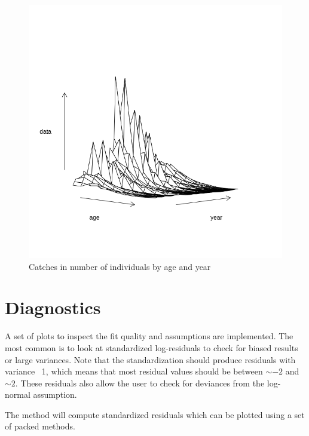 \documentclass[a4paper,english,10pt]{article}\usepackage[]{graphicx}\usepackage[]{color}
\newenvironment{knitrout}{}{} %
\begin{document}
\begin{knitrout}
\color{fgcolor}\begin{figure}[H]

{\centering \includegraphics[width=.9\linewidth]{figure/C-1} 

}

\caption[Catches in number of individuals by age and year]{Catches in number of individuals by age and year}\label{fig:C}
\end{figure}


\end{knitrout}

\section{Diagnostics}

A set of plots to inspect the fit quality and assumptions are implemented. The most common is to look at standardized log-residuals to check for biased results or large variances. Note that the standardization should produce residuals with variance ~1, which means that most residual values should be between $\sim -2$ and $\sim 2$. These residuals also allow the user to check for deviances from the log-normal assumption.

The  method will compute standardized residuals which can be plotted using a set of packed methods.
\end{document}
